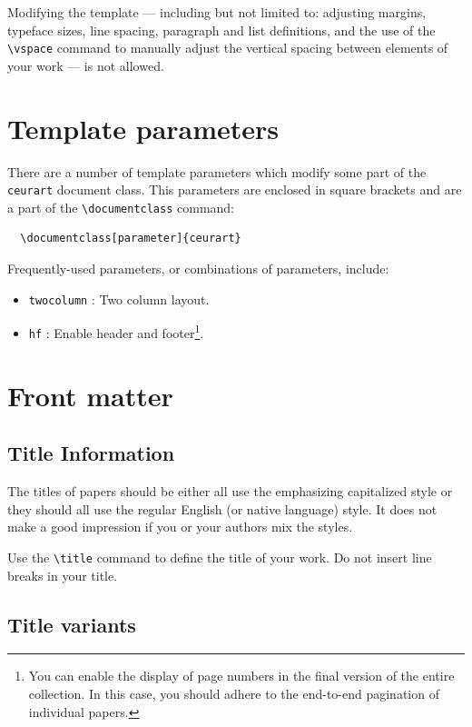 \documentclass[]{ceurart}
\begin{document}
Modifying the template --- including but not limited to: adjusting
margins, typeface sizes, line spacing, paragraph and list definitions,
and the use of the \verb|\vspace| command to manually adjust the
vertical spacing between elements of your work --- is not allowed.

\section{Template parameters}

There are a number of template
parameters which modify some part of the \verb|ceurart| document class.
This parameters are enclosed in square
brackets and are a part of the \verb|\documentclass| command:
\begin{verbatim}
  \documentclass[parameter]{ceurart}
\end{verbatim}

Frequently-used parameters, or combinations of parameters, include:
\begin{itemize}
\item \verb|twocolumn| : Two column layout.
\item \verb|hf| : Enable header and footer\footnote{You can enable
    the display of page numbers in the final version of the entire
    collection. In this case, you should adhere to the end-to-end
    pagination of individual papers.}.
\end{itemize}

\section{Front matter}

\subsection{Title Information}

The titles of papers should be either all use the emphasizing
capitalized style or they should all use the regular English (or
native language) style. It does not make a good impression if you or
your authors mix the styles.

Use the \verb|\title| command to define the title of your work. Do not
insert line breaks in your title.

\subsection{Title variants}
\end{document}
